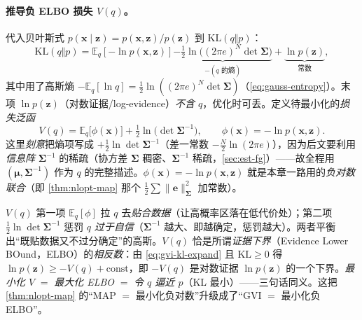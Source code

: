 \paragraph{推导负 ELBO 损失 $V(q)$。}
代入贝叶斯式 $p(\mathbf{x}\mid\mathbf{z})=p(\mathbf{x},\mathbf{z})/p(\mathbf{z})$ 到 $\mathrm{KL}(q\Vert p)$：
\begin{equation}
  \mathrm{KL}(q\Vert p)=\mathbb{E}_q[-\ln p(\mathbf{x},\mathbf{z})]
  \underbrace{-\tfrac12\ln\!\big((2\pi e)^N\det\boldsymbol{\Sigma}\big)}_{-(\text{$q$ 的熵})}
  +\underbrace{\ln p(\mathbf{z})}_{\text{常数}},
  \label{eq:gvi-kl-expand}
\end{equation}
其中用了高斯熵 $-\mathbb{E}_q[\ln q]=\tfrac12\ln((2\pi e)^N\det\boldsymbol{\Sigma})$（\cref{eq:gauss-entropy}）。末项 $\ln p(\mathbf{z})$（对数证据/log-evidence）\emph{不含 $q$}，优化时可丢。定义待最小化的\emph{损失泛函}
\begin{equation}
  \boxed{\ V(q)=\mathbb{E}_q\big[\phi(\mathbf{x})\big]+\tfrac12\ln\!\big(\det\boldsymbol{\Sigma}^{-1}\big),\qquad \phi(\mathbf{x})=-\ln p(\mathbf{x},\mathbf{z}).\ }
  \label{eq:gvi-V}
\end{equation}
这里\emph{刻意}把熵项写成 $+\tfrac12\ln\det\boldsymbol{\Sigma}^{-1}$（差一常数 $-\tfrac{N}{2}\ln(2\pi e)$），因为后文要利用\emph{信息阵} $\boldsymbol{\Sigma}^{-1}$ 的稀疏（协方差 $\boldsymbol{\Sigma}$ 稠密、$\boldsymbol{\Sigma}^{-1}$ 稀疏，\cref{sec:est-fg}）——故全程用 $(\boldsymbol{\mu},\boldsymbol{\Sigma}^{-1})$ 作为 $q$ 的完整描述。$\phi(\mathbf{x})=-\ln p(\mathbf{x},\mathbf{z})$ 就是本章一路用的\emph{负对数联合}（即 \cref{thm:nlopt-map} 那个 $\tfrac12\sum\|\mathbf{e}\|_{\boldsymbol{\Sigma}}^2$ 加常数）。

\begin{insight}
$V(q)$ 第一项 $\mathbb{E}_q[\phi]$ 拉 $q$ 去\emph{贴合数据}（让高概率区落在低代价处）；第二项 $\tfrac12\ln\det\boldsymbol{\Sigma}^{-1}$ 惩罚 $q$ \emph{过于自信}（$\boldsymbol{\Sigma}^{-1}$ 越大、即越确定，惩罚越大）。两者平衡出“既贴数据又不过分确定”的高斯。$V(q)$ 恰是所谓\emph{证据下界}（Evidence Lower BOund，ELBO）的\emph{相反数}：由 \cref{eq:gvi-kl-expand} 且 $\mathrm{KL}\ge0$ 得 $\ln p(\mathbf{z})\ge-V(q)+\text{const}$，即 $-V(q)$ 是对数证据 $\ln p(\mathbf{z})$ 的一个下界。\emph{最小化 $V$} $=$ \emph{最大化 ELBO} $=$ \emph{令 $q$ 逼近 $p$}（KL 最小）——三句话同义。这把 \cref{thm:nlopt-map} 的“MAP $=$ 最小化负对数”升级成了“GVI $=$ 最小化负 ELBO”。
\end{insight}

